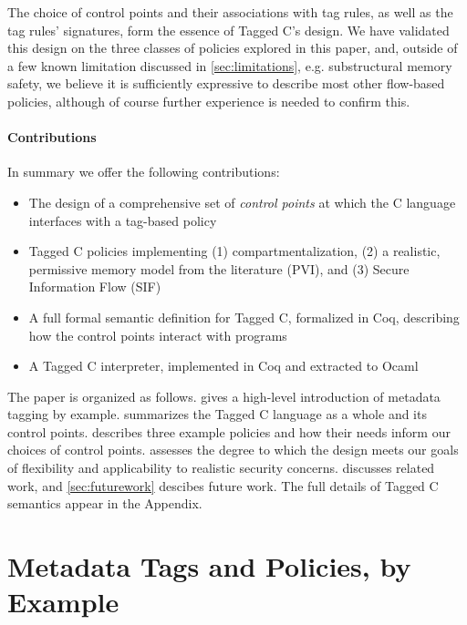 \documentclass{llncs}
\begin{document}
The choice of control points and their associations with tag rules, as well as the tag rules'
signatures, form the essence of Tagged C's design. 
We have validated this design on the three classes of policies explored in this paper,
and, outside of a few known limitation discussed in \cref{sec:limitations}, e.g. substructural memory safety,
we believe it is sufficiently expressive to describe most other flow-based policies, although
of course further experience is needed to confirm this.

\paragraph{Contributions}

In summary we offer the following contributions:

\begin{itemize}
\item The design of a comprehensive set of {\em control points} at which the C language interfaces with a tag-based policy
\item Tagged C policies implementing (1) compartmentalization,
  (2) a realistic, permissive memory model from the literature (PVI),
  and (3) Secure Information Flow (SIF)
\item A full formal semantic definition for Tagged C, formalized in Coq, describing how the control points
  interact with programs
\item A Tagged C interpreter, implemented in Coq and extracted to Ocaml
\end{itemize}

The paper is organized as follows.
 gives a high-level introduction of metadata tagging by example.
 summarizes the Tagged C language as a whole and its control points.
 describes three example policies and how their
needs inform our choices of control points. 
 assesses the degree to
which the design meets our goals of flexibility and applicability to realistic
security concerns.
 discusses related work, and \cref{sec:futurework} descibes future work.
The full details of Tagged C semantics appear in the Appendix.


\section{Metadata Tags and Policies, by Example}
\label{sec:example}
\end{document}
